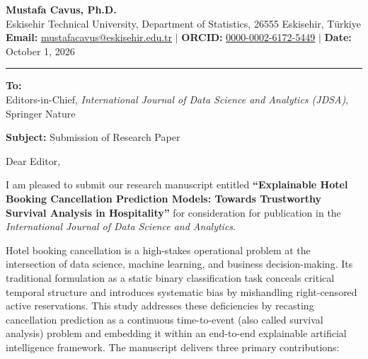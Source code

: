 \documentclass[10.5pt,a4paper]{article}
\begin{document}
\begin{flushright}
    \textbf{Mustafa Cavus, Ph.D.} \\
    Eskisehir Technical University, Department of Statistics, 26555 Eskisehir, T\"urkiye \\
    \textbf{Email:} \href{mailto:mustafacavus@eskisehir.edu.tr}{mustafacavus@eskisehir.edu.tr} \quad $\vert$ \quad \textbf{ORCID:} \href{https://orcid.org/0000-0002-6172-5449}{0000-0002-6172-5449} \quad $\vert$ \quad \textbf{Date:} October 1, 2026
\end{flushright}

\vspace{-0.3cm}
\hrule
\vspace{0.25cm}

\textbf{To:} \\
Editors-in-Chief, \textit{International Journal of Data Science and Analytics (JDSA)}, Springer Nature

\textbf{Subject:} Submission of Research Paper 

Dear Editor,

I am pleased to submit our research manuscript entitled \textbf{``Explainable Hotel Booking Cancellation Prediction Models: Towards Trustworthy Survival Analysis in Hospitality''} for consideration for publication in the \textit{International Journal of Data Science and Analytics}.

Hotel booking cancellation is a high-stakes operational problem at the intersection of data science, machine learning, and business decision-making. Its traditional formulation as a static binary classification task conceals critical temporal structure and introduces systematic bias by mishandling right-censored active reservations. This study addresses these deficiencies by recasting cancellation prediction as a continuous time-to-event (also called survival analysis) problem and embedding it within an end-to-end explainable artificial intelligence framework. The manuscript delivers three primary contributions:
\end{document}

